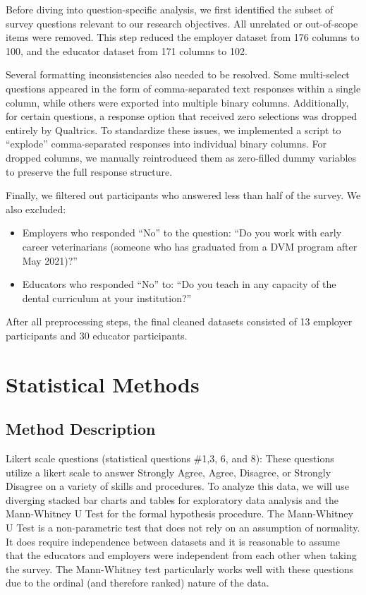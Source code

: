 \documentclass[
  11pt,
  letterpaper,
  DIV=11,
  numbers=noendperiod]{scrartcl}
\numberwithin{figure}{section}
\begin{document}
Before diving into question-specific analysis, we first identified the
subset of survey questions relevant to our research objectives. All
unrelated or out-of-scope items were removed. This step reduced the
employer dataset from 176 columns to 100, and the educator dataset from
171 columns to 102.

Several formatting inconsistencies also needed to be resolved. Some
multi-select questions appeared in the form of comma-separated text
responses within a single column, while others were exported into
multiple binary columns. Additionally, for certain questions, a response
option that received zero selections was dropped entirely by Qualtrics.
To standardize these issues, we implemented a script to ``explode''
comma-separated responses into individual binary columns. For dropped
columns, we manually reintroduced them as zero-filled dummy variables to
preserve the full response structure.

Finally, we filtered out participants who answered less than half of the
survey. We also excluded:

\begin{itemize}
\item
  Employers who responded ``No'' to the question: ``Do you work with
  early career veterinarians (someone who has graduated from a DVM
  program after May 2021)?''
\item
  Educators who responded ``No'' to: ``Do you teach in any capacity of
  the dental curriculum at your institution?''
\end{itemize}

After all preprocessing steps, the final cleaned datasets consisted of
13 employer participants and 30 educator participants.

\hypertarget{statistical-methods}{%
\section{Statistical Methods}\label{statistical-methods}}

\hypertarget{method-description}{%
\subsection{Method Description}\label{method-description}}

Likert scale questions (statistical questions \#1,3, 6, and 8): These
questions utilize a likert scale to answer Strongly Agree, Agree,
Disagree, or Strongly Disagree on a variety of skills and procedures. To
analyze this data, we will use diverging stacked bar charts and tables
for exploratory data analysis and the Mann-Whitney U Test for the formal
hypothesis procedure. The Mann-Whitney U Test is a non-parametric test
that does not rely on an assumption of normality. It does require
independence between datasets and it is reasonable to assume that the
educators and employers were independent from each other when taking the
survey. The Mann-Whitney test particularly works well with these
questions due to the ordinal (and therefore ranked) nature of the data.
\end{document}
